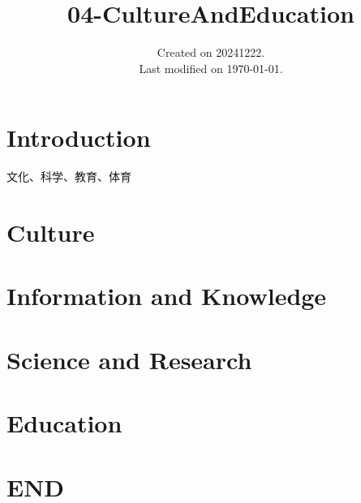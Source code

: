 \documentclass[UTF8]{../ApplicationUniverse}
\begin{document}
\title{04-CultureAndEducation}
\date{Created on 20241222.\\   Last modified on \today.}
\maketitle
\tableofcontents


\chapter{Introduction}


文化、科学、教育、体育



\chapter{Culture}%


\chapter{Information and Knowledge}%


\chapter{Science and Research}%


\chapter{Education}%



\chapter{END}
\end{document}
